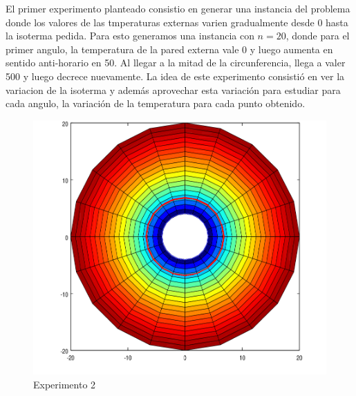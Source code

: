 El primer experimento planteado consistio en generar una instancia del problema donde los valores de las tmperaturas externas varien gradualmente desde 0 hasta la isoterma pedida. Para esto generamos una instancia con $n=20$, donde para el primer angulo, la temperatura de la pared externa vale $0$ y luego aumenta en sentido anti-horario en 50. Al llegar a la mitad de la circunferencia, llega a valer 500 y luego decrece nuevamente. La idea de este experimento consistió en ver la variacion de la isoterma y además aprovechar esta variación para estudiar para cada angulo, la variación de la temperatura para cada punto obtenido.
\\
\begin{figure}
  \vspace{-20pt}
  \begin{center}
    \includegraphics[scale= 0.4]{imagenes/hornoInvertidColoroConIso.png}
  \end{center}
  \vspace{-20pt}
  \caption{Experimento 2}
  \vspace{-10pt}
  \label{fig:Exp1}
\end{figure}

